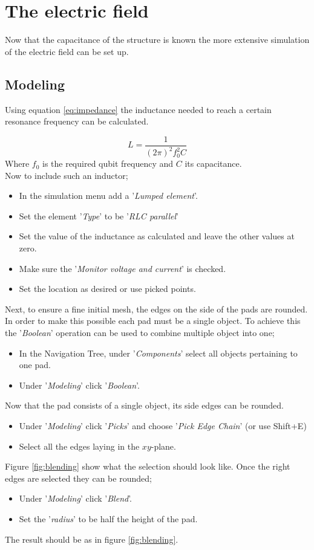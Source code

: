 \section{The electric field}
Now that the capacitance of the structure is known the more extensive simulation of the electric field can be set up.
\subsection{Modeling}
Using equation \eqref{eq:impedance} the inductance needed to reach a certain resonance frequency can be calculated. 

\begin{equation}\label{eq:impedance}
L = \frac{1}{(2\pi)^{2}f_{0}^{2}C}
\end{equation}
Where \(f_{0}\) is the required qubit frequency and \(C\) its capacitance.\\
Now to include such an inductor;
\begin{itemize}
	\item In the simulation menu add a '\textit{Lumped element}'.
	\item Set the element '\textit{Type}' to be '\textit{RLC parallel}'
	\item Set the value of the inductance as calculated and leave the other values at zero.
	\item Make sure the '\textit{Monitor voltage and current}' is checked.
	\item Set the location as desired or use picked points.
\end{itemize}

Next, to ensure a fine initial mesh, the edges on the side of the pads are rounded. In order to make this possible each pad must be a single object. To achieve this the '\textit{Boolean}' operation can be used to combine multiple object into one;

\begin{itemize}
	\item In the Navigation Tree, under '\textit{Components}' select all objects pertaining to one pad.
	\item Under '\textit{Modeling}' click '\textit{Boolean}'.
\end{itemize}
Now that the pad consists of a single object, its side edges can be rounded.
\begin{itemize}
	\item Under '\textit{Modeling}' click '\textit{Picks}' and choose '\textit{Pick Edge Chain}' (or use Shift+E)
	\item Select all the edges laying in the \(xy\)-plane.
\end{itemize}
Figure \ref{fig:blending} show what the selection should look like. Once the right edges are selected they can be rounded;
\begin{itemize}
	\item Under '\textit{Modeling}' click '\textit{Blend}'.
	\item Set the '\textit{radius}' to be half the height of the pad. 
\end{itemize}
The result should be as in figure \ref{fig:blending}.


